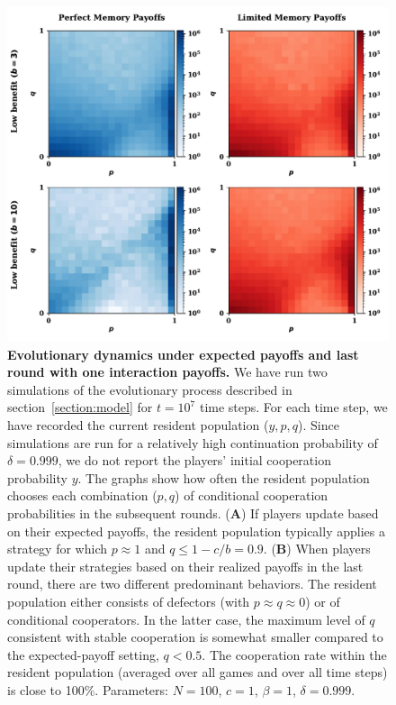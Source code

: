 \documentclass[11pt]{article}
\theoremstyle{plainCl1}
\theoremstyle{plainCl2}
\begin{document}
\begin{figure}[!htbp]
    \centering
    \includegraphics[width=.70\textwidth]{static/expected_and_stochastic_for_donation_game.pdf}
    \caption{{\bf Evolutionary dynamics under expected payoffs and last round with one interaction payoffs.} 
    We have run two simulations of the evolutionary process described in
    section~\ref{section:model} for $t\!=\!10^7$ time steps. For each time step,
    we have recorded the current resident population ($y,p,q$). Since
    simulations are run for a relatively high continuation probability of
    $\delta\!=\!0.999$, we do not report the players' initial cooperation
    probability $y$. The graphs show how often the resident population chooses
    each combination ($p,q$) of conditional cooperation probabilities in the
    subsequent rounds. ({\bf A}) If players update based on their expected
    payoffs, the resident population typically applies a strategy for which
    $p\!\approx\!1$ and $q\!\le\!1\!-\!c/b\!=\!0.9$. ({\bf B}) When players
    update their strategies based on their realized payoffs in the last round,
    there are two different predominant behaviors. The resident population
    either consists of defectors (with $p\!\approx\!q\!\approx\!0$) or of
    conditional cooperators. In the latter case, the maximum level of $q$
    consistent with stable cooperation is somewhat smaller compared to the
    expected-payoff setting, $q\!<\!0.5$. The cooperation rate within the
    resident population (averaged over all games and over all time steps) is
    close to 100\%. Parameters: $N\!=\!100$, $c\!=\!1$, $\beta\!=\!1$,
    $\delta\!=\!0.999$.}
    \label{fig:expected_and_stochastic_for_donation}
\end{figure}
\end{document}
